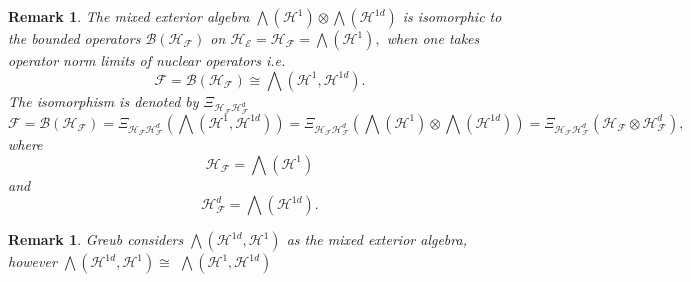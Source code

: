 \documentclass[aps,preprint]{revtex4}%
\newtheorem{remark}[theorem]{Remark}
\begin{document}
\begin{remark}
The mixed exterior algebra $%
{\textstyle\bigwedge}
\left(  \mathcal{H}^{1}\right)  \otimes%
{\textstyle\bigwedge}
\left(  \mathcal{H}^{1d}\right)  $ is isomorphic to the bounded operators
$\mathcal{B}\left(  \mathcal{H}_{\mathcal{F}}\right)  $ on $\mathcal{H}%
_{\mathcal{E}}=\mathcal{H}_{\mathcal{F}}=%
{\textstyle\bigwedge}
\left(  \mathcal{H}^{1}\right)  ,$ when one takes operator norm limits of
nuclear operators i.e.
\begin{equation}
\mathcal{F}=\mathcal{B}\left(  \mathcal{H}_{\mathcal{F}}\right)  \cong%
{\textstyle\bigwedge}
\left(  \mathcal{H}^{1},\mathcal{H}^{1d}\right)  .
\end{equation}
The isomorphism is denoted by $\Xi_{\mathcal{H}_{\mathcal{F}}\mathcal{H}%
_{\mathcal{F}}^{d}}$
\begin{equation}
\mathcal{F}=\mathcal{B}\left(  \mathcal{H}_{\mathcal{F}}\right)
=\Xi_{\mathcal{H}_{\mathcal{F}}\mathcal{H}_{\mathcal{F}}^{d}}\left(
{\textstyle\bigwedge}
\left(  \mathcal{H}^{1},\mathcal{H}^{1d}\right)  \right)  =\Xi_{\mathcal{H}%
_{\mathcal{F}}\mathcal{H}_{\mathcal{F}}^{d}}\left(
{\textstyle\bigwedge}
\left(  \mathcal{H}^{1}\right)  \otimes%
{\textstyle\bigwedge}
\left(  \mathcal{H}^{1d}\right)  \right)  =\Xi_{\mathcal{H}_{\mathcal{F}%
}\mathcal{H}_{\mathcal{F}}^{d}}\left(  \mathcal{H}_{\mathcal{F}}%
\otimes\mathcal{H}_{\mathcal{F}}^{d}\right)  ,
\end{equation}
where
\begin{equation}
\mathcal{H}_{\mathcal{F}}=%
{\textstyle\bigwedge}
\left(  \mathcal{H}^{1}\right)
\end{equation}
and
\begin{equation}
\mathcal{H}_{\mathcal{F}}^{d}=%
{\textstyle\bigwedge}
\left(  \mathcal{H}^{1d}\right)  .
\end{equation}

\end{remark}

\begin{remark}
Greub considers $%
{\textstyle\bigwedge}
\left(  \mathcal{H}^{1d},\mathcal{H}^{1}\right)  $ as the mixed exterior
algebra, however $%
{\textstyle\bigwedge}
\left(  \mathcal{H}^{1d},\mathcal{H}^{1}\right)  \cong$ $%
{\textstyle\bigwedge}
\left(  \mathcal{H}^{1},\mathcal{H}^{1d}\right)  $
\end{remark}
\end{document}
